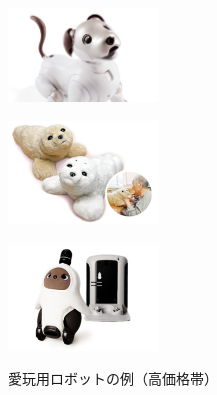 \documentclass[uplatex,a4paper,12pt]{jsarticle}
\begin{document}
\begin{figure}[htbp]
  \centering
  \begin{minipage}[c]{0.32\linewidth}
    \centering
    \includegraphics[keepaspectratio,width=4cm,clip]{images/previous_robots/aibo.jpg}
    \label{fig:aibo}
  \end{minipage}
  \begin{minipage}[c]{0.32\linewidth}
    \centering
    \includegraphics[keepaspectratio,width=4cm,clip]{images/previous_robots/paro.png}
    \label{fig:paro}
  \end{minipage}
  \begin{minipage}[c]{0.32\linewidth}
    \centering
    \includegraphics[keepaspectratio,width=4cm,clip]{images/previous_robots/lovot.png}
    \label{fig:lovot}
  \end{minipage}
  \caption{愛玩用ロボットの例（高価格帯）}
  \label{fig:previous_robots_expensive}
\end{figure}
\end{document}
